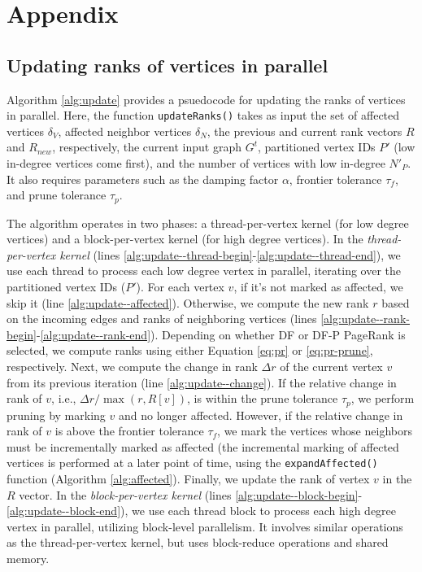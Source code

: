 





\clearpage

\section{Appendix}



\subsection{Updating ranks of vertices in parallel}
\label{sec:update}

Algorithm \ref{alg:update} provides a psuedocode for updating the ranks of vertices in parallel. Here, the function \texttt{updateRanks()} takes as input the set of affected vertices $\delta_V$, affected neighbor vertices $\delta_N$, the previous and current rank vectors $R$ and $R_{new}$, respectively, the current input graph $G^t$, partitioned vertex IDs $P'$ (low in-degree vertices come first), and the number of vertices with low in-degree $N'_P$. It also requires parameters such as the damping factor $\alpha$, frontier tolerance $\tau_f$, and prune tolerance $\tau_p$.

The algorithm operates in two phases: a thread-per-vertex kernel (for low degree vertices) and a block-per-vertex kernel (for high degree vertices). In the \textit{thread-per-vertex kernel} (lines \ref{alg:update--thread-begin}-\ref{alg:update--thread-end}), we use each thread to process each low degree vertex in parallel, iterating over the partitioned vertex IDs ($P'$). For each vertex $v$, if it's not marked as affected, we skip it (line \ref{alg:update--affected}). Otherwise, we compute the new rank $r$ based on the incoming edges and ranks of neighboring vertices (lines \ref{alg:update--rank-begin}-\ref{alg:update--rank-end}). Depending on whether DF or DF-P PageRank is selected, we compute ranks using either Equation \ref{eq:pr} or \ref{eq:pr-prune}, respectively. Next, we compute the change in rank $\Delta r$ of the current vertex $v$ from its previous iteration (line \ref{alg:update--change}). If the relative change in rank of $v$, i.e., $\Delta r / \max(r, R[v])$, is within the prune tolerance $\tau_p$, we perform pruning by marking $v$ and no longer affected. However, if the relative change in rank of $v$ is above the frontier tolerance $\tau_f$, we mark the vertices whose neighbors must be incrementally marked as affected (the incremental marking of affected vertices is performed at a later point of time, using the \texttt{expandAffected()} function (Algorithm \ref{alg:affected}). Finally, we update the rank of vertex $v$ in the $R$ vector. In the \textit{block-per-vertex kernel} (lines \ref{alg:update--block-begin}-\ref{alg:update--block-end}), we use each thread block to process each high degree vertex in parallel, utilizing block-level parallelism. It involves similar operations as the thread-per-vertex kernel, but uses block-reduce operations and shared memory.


